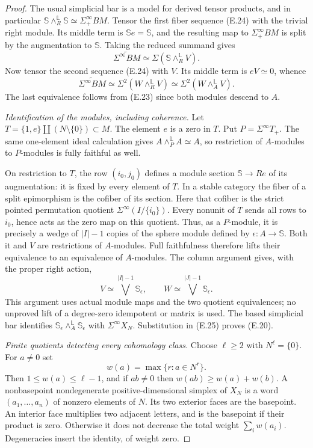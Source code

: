 \begin{proof}
The usual simplicial bar is a model for derived tensor products, and
in particular
$\mathbb S\wedge_R^{\mathbb L}\mathbb S\simeq\Sigma^\infty_+BM$.
Tensor the first fiber sequence (E.24) with the trivial right module.
Its middle term is $\mathbb S e=\mathbb S$, and the resulting map to
$\Sigma^\infty_+BM$ is split by the augmentation to $\mathbb S$.
Taking the reduced summand gives
\[
 \widetilde{\Sigma^\infty BM}
       \simeq\Sigma(\mathbb S\wedge_R^{\mathbb L}V).
\]
Now tensor the second sequence (E.24) with $V$.  Its middle term is
$eV\simeq0$, whence
\[
 \widetilde{\Sigma^\infty BM}
       \simeq\Sigma^2(W\wedge_R^{\mathbb L}V)
       \simeq\Sigma^2(W\wedge_A^{\mathbb L}V).           \tag{E.25}
\]
The last equivalence follows from (E.23) since both modules descend
to $A$.

\emph{Identification of the modules, including coherence.}
Let $T=\{1,e\}\amalg(N\setminus\{0\})\subset M$.
The element $e$ is a zero in $T$.  Put $P=\Sigma^\infty T_+$.
The same one-element ideal calculation gives
$A\wedge_P^{\mathbb L}A\simeq A$, so restriction of $A$-modules to
$P$-modules is fully faithful as well.

On restriction to $T$, the row $(i_0,j_0)$ defines a module section
$\mathbb S\to Re$ of its augmentation: it is fixed by every element
of $T$.  In a stable category the fiber of a split epimorphism is the
cofiber of its section.  Here that cofiber is the strict pointed
permutation quotient $\Sigma^\infty(I/\{i_0\})$.
Every nonunit of $T$ sends all rows to $i_0$, hence acts as the zero
map on this quotient.  Thus, as a $P$-module, it is precisely a wedge
of $|I|-1$ copies of the sphere module defined by $\epsilon:A\to\mathbb S$.
Both it and $V$ are restrictions of $A$-modules.  Full faithfulness
therefore lifts their equivalence to an equivalence of $A$-modules.
The column argument gives, with the proper right action,
\[
 V\simeq\bigvee^{|I|-1}\mathbb S_\epsilon,
 \qquad W\simeq\bigvee^{|J|-1}\mathbb S_\epsilon.
\]
This argument uses actual module maps and the two quotient equivalences;
no unproved lift of a degree-zero idempotent or matrix is used.
The based simplicial bar identifies
$\mathbb S_\epsilon\wedge_A^{\mathbb L}\mathbb S_\epsilon$
with $\Sigma^\infty X_N$.  Substitution in (E.25) proves (E.20).

\emph{Finite quotients detecting every cohomology class.}
Choose $\ell\geq2$ with $N^\ell=\{0\}$.  For $a\ne0$ set
\[
 w(a)=\max\{r:a\in N^r\}.
\]
Then $1\leq w(a)\leq\ell-1$, and if $ab\ne0$ then
$w(ab)\geq w(a)+w(b)$.  A nonbasepoint nondegenerate positive-dimensional
simplex of $X_N$ is a word $(a_1,\ldots,a_n)$ of nonzero elements of $N$.
Its two exterior faces are the basepoint.  An interior face multiplies
two adjacent letters, and is the basepoint if their product is zero.
Otherwise it does not decrease the total weight
$\sum_iw(a_i)$.  Degeneracies insert the identity, of weight zero.


\end{proof}
